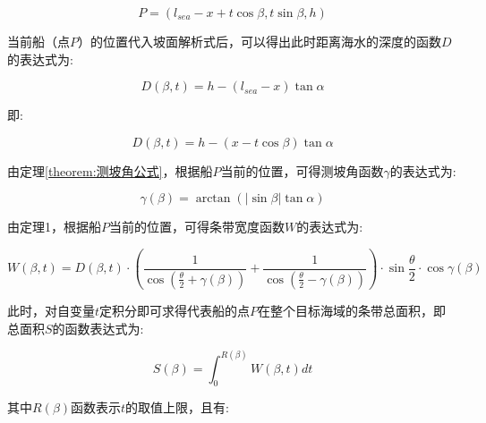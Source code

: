 \begin{equation}
    P = (l_{sea} - x + t\cos \beta, 
        t\sin \beta, 
        h)
\end{equation}

当前船（点$P$）的位置代入坡面解析式后，可以得出此时距离海水的深度的函数$D$的表达式为:

\begin{equation*}
    D(\beta, t) = 
    h - \left(l_{sea} - x\right)\tan \alpha
\end{equation*}

即:

\begin{equation}
    D(\beta, t) = 
    h - \left(x - t\cos \beta \right)\tan \alpha
\end{equation}

由定理\ref{theorem:测坡角公式}，根据船$P$当前的位置，可得测坡角函数$\gamma$的表达式为:

\begin{equation}
    \gamma(\beta) = 
    \arctan \left(|\sin \beta| \tan \alpha\right)
\end{equation}

由定理1，根据船$P$当前的位置，可得条带宽度函数$W$的表达式为:

\begin{equation}
    W(\beta, t) = 
    D(\beta, t)\cdot 
    \left(
        \frac{1}{\cos (\frac{\theta}{2} + \gamma(\beta))} +
        \frac{1}{\cos (\frac{\theta}{2} - \gamma(\beta))}
    \right)\cdot
    \sin {\frac{\theta}{2}}\cdot \cos \gamma(\beta)
\end{equation}

此时，对自变量$t$定积分即可求得代表船的点$P$在整个目标海域的条带总面积，即总面积$S$的函数表达式为:

\begin{equation}
    S(\beta) = 
    \int _{0} ^{R(\beta)} {
        W(\beta, t)dt
    }
\end{equation}

其中$R(\beta)$函数表示$t$的取值上限，且有:

